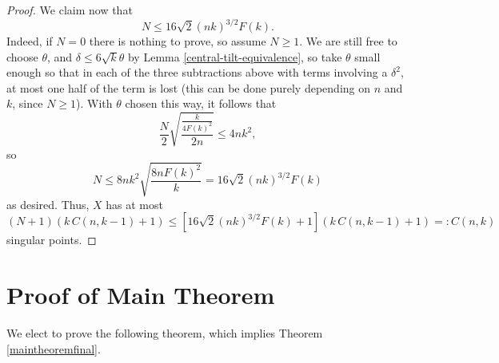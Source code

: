 \documentclass[11pt,reqno,twoside]{amsart}
\theoremstyle{definition}
\begin{document}
\begin{proof}
We claim now that \[N \leq 16\sqrt{2}(nk)^{3/2} F(k).\] Indeed, if $N = 0$ there is nothing to prove, so assume $N \geq 1$. We are still free to choose $\theta$, and $\delta \leq 6\sqrt{k} \theta$ by Lemma \ref{central-tilt-equivalence}, so take $\theta$ small enough so that in each of the three subtractions above with terms involving a $\delta^2$, at most one half of the term is lost (this can be done purely depending on $n$ and $k$, since $N \geq 1$). With $\theta$ chosen this way, it follows that 
    \[ \frac{N}{2} \sqrt{\frac{\frac{k}{4F(k)^2}}{2n}} \leq  4nk^2,\]
    so
    \[N \leq 8nk^2 \sqrt{\frac{8nF(k)^2}{k}} = 16\sqrt{2}(nk)^{3/2} F(k) \]
    as desired.
    Thus, $X$ has at most
    \[(N+1) (k \, C(n,k-1) + 1) \leq \left[ 16\sqrt{2}(nk)^{3/2} F(k) + 1\right] (k \, C(n,k-1) + 1) =: C(n,k) \]
    singular points.
\end{proof}

    \section{Proof of Main Theorem}
    \label{sec:proofmaintheorem}

    We elect to prove the following theorem, which implies Theorem \ref{maintheoremfinal}.
\end{document}
